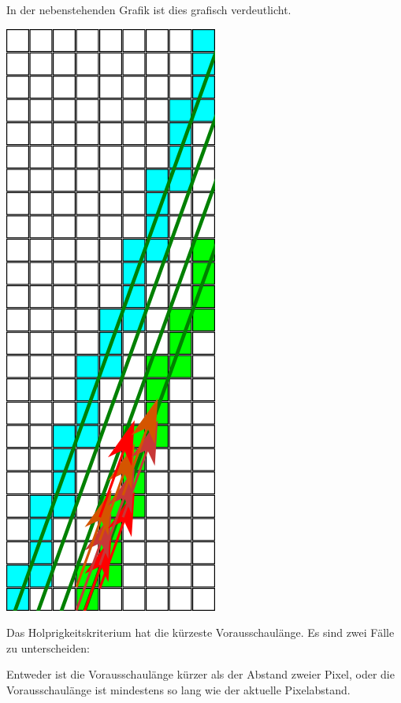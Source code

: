 \documentclass[
11pt, %
a4paper, %
oneside, %
pdfspacing, %
headinclude,
BCOR5mm, %
ngerman, %
bibtotocnumbered,
]{scrartcl}
\begin{document}
\begin{minipage}{\textwidth}
\begin{minipage}[t]{\textwidth-4cm}
			In der nebenstehenden Grafik ist dies grafisch verdeutlicht.
		\end{minipage}
		\begin{minipage}[t]{3cm}
			\vspace{0pt}
			\centering
			\includegraphics{./drawings/Durchmusterungspfad.png}
		\end{minipage}
	\skippingparagraph
	\end{minipage}
	
	
	
	Das Holprigkeitskriterium hat die kürzeste Vorausschaulänge. Es sind zwei Fälle zu unterscheiden: 
	
	Entweder ist die Vorausschaulänge kürzer als der Abstand zweier Pixel, oder die Vorausschaulänge ist mindestens so lang wie der aktuelle Pixelabstand.
	
\end{document}
